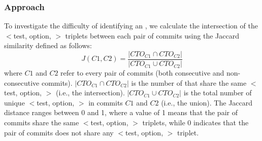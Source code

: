\subsubsection*{Approach}

To investigate the difficulty of identifying an \inconsistent, we calculate the intersection of the $<$test, option, \inconsistent$>$ triplets between each pair of commits %
using the Jaccard similarity defined as follows:
\begin{equation}
J(C1,C2) = \frac{|CTO_{C1} \cap CTO_{C2}|}{|CTO_{C1} \cup CTO_{C2}|}
\end{equation} 
where $C1$ and $C2$ refer to every pair of commits (both consecutive and non-consecutive commits). $|CTO_{C1} \cap CTO_{C2}|$ is the number of \instance that share the same $<$test, option, \inconsistent$>$ (i.e., the intersection). 
$|CTO_{C1} \cup CTO_{C2}|$ is the total number of unique $<$test, option, \inconsistent$>$ in commits $C1$ and $C2$ (i.e., the union). %
The Jaccard distance ranges %
between 0 %
and 1, where a value of 1 means that the pair of commits share the same $<$test, option, \inconsistent$>$ triplets, while 0 indicates that the pair of commits does not share any $<$test, option, \inconsistent$>$ triplet.

